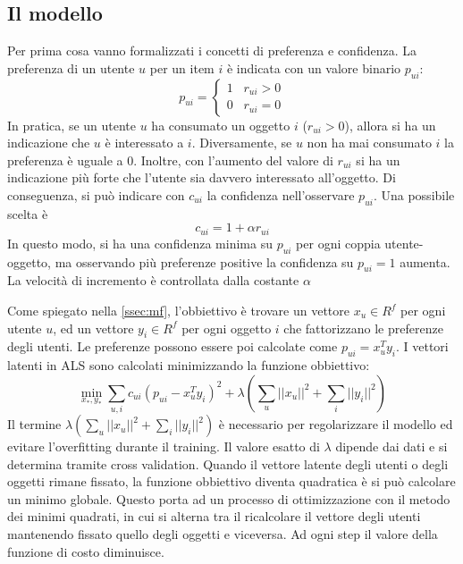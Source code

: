 \documentclass[12pt,italian]{report}
\begin{document}
\subsection{Il modello}
Per prima cosa vanno formalizzati i concetti di preferenza e confidenza. La preferenza di un utente $u$ per un item $i$ è indicata con un valore binario $p_{ui}$:
$$
p_{ui} =     \begin{cases}
				1 \;\;\; r_{ui} > 0 \\
				0 \;\;\; r_{ui} = 0
              \end{cases}
$$
In pratica, se un utente $u$ ha consumato un oggetto $i$ ($r_{ui} > 0$), allora si ha un indicazione che $u$ è interessato a $i$. Diversamente, se $u$ non ha mai consumato $i$ la preferenza è uguale a 0. Inoltre, con l'aumento del valore di $r_{ui}$ si ha un indicazione più forte che l'utente sia davvero interessato all'oggetto. Di conseguenza, si può indicare con $c_{ui}$ la confidenza nell'osservare $p_{ui}$. Una possibile scelta è
$$
c_{ui} = 1 + \alpha r_{ui}
$$
In questo modo, si ha una confidenza minima su $p_{ui}$ per ogni coppia utente-oggetto, ma osservando più preferenze positive la confidenza su $p_{ui} = 1$ aumenta. La velocità di incremento è controllata dalla costante $\alpha$

Come spiegato nella \autoref{ssec:mf}, l'obbiettivo è trovare un vettore $x_u \in R^f$ per ogni utente $u$, ed un vettore $y_i \in R^f$ per ogni oggetto $i$ che fattorizzano le preferenze degli utenti. Le preferenze possono essere poi calcolate come $p_{ui} = x_u^Ty_i$. I vettori latenti in ALS sono calcolati minimizzando la funzione obbiettivo:	
$$
\min_{x_*,y_*} \sum_{u,i} c_{ui} (p_{ui} - x_u^Ty_i)^2 + 
\lambda \left( \sum_u ||x_u||^2 + \sum_i ||y_i||^2 \right)
$$
Il termine $\lambda \left( \sum_u ||x_u||^2 + \sum_i ||y_i||^2 \right)$ è necessario per regolarizzare il modello ed evitare l'overfitting durante il training. Il valore esatto di $\lambda$ dipende dai dati e si determina tramite cross validation. 
Quando il vettore latente degli utenti o degli oggetti rimane fissato, la funzione obbiettivo diventa quadratica è si può calcolare un minimo globale. Questo porta ad un processo di ottimizzazione con il metodo dei minimi quadrati, in cui si alterna tra il ricalcolare il vettore degli utenti mantenendo fissato quello degli oggetti e viceversa. Ad ogni step il valore della funzione di costo diminuisce.
\end{document}

